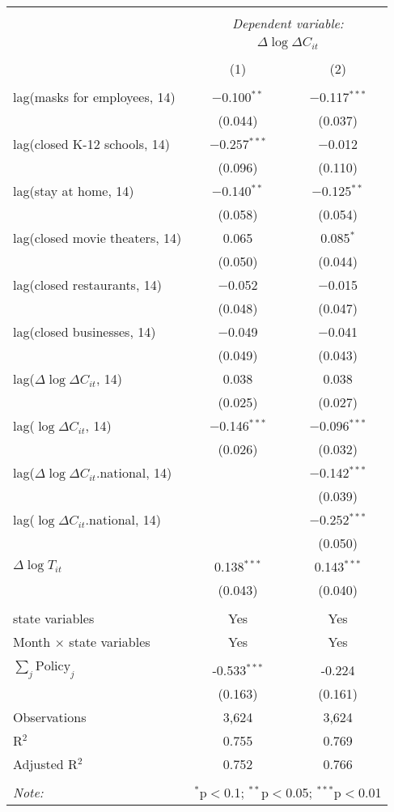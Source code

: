 \begin{tabular}{@{\extracolsep{1pt}}lcc} 
\\[-1.8ex]\hline 
\hline \\[-1.8ex] 
 & \multicolumn{2}{c}{\textit{Dependent variable:}} \\ 
\cline{2-3} 
 & \multicolumn{2}{c}{$\Delta \log \Delta C_{it}$} \\ 
\\[-1.8ex] & (1) & (2)\\ 
\hline \\[-1.8ex] 
 lag(masks for employees, 14) & $-$0.100$^{**}$ & $-$0.117$^{***}$ \\ 
  & (0.044) & (0.037) \\ 
  lag(closed K-12 schools, 14) & $-$0.257$^{***}$ & $-$0.012 \\ 
  & (0.096) & (0.110) \\ 
  lag(stay at home, 14) & $-$0.140$^{**}$ & $-$0.125$^{**}$ \\ 
  & (0.058) & (0.054) \\ 
  lag(closed movie theaters, 14) & 0.065 & 0.085$^{*}$ \\ 
  & (0.050) & (0.044) \\ 
  lag(closed restaurants, 14) & $-$0.052 & $-$0.015 \\ 
  & (0.048) & (0.047) \\ 
  lag(closed businesses, 14) & $-$0.049 & $-$0.041 \\ 
  & (0.049) & (0.043) \\ 
  lag($\Delta \log \Delta C_{it}$, 14) & 0.038 & 0.038 \\ 
  & (0.025) & (0.027) \\ 
  lag($\log \Delta C_{it}$, 14) & $-$0.146$^{***}$ & $-$0.096$^{***}$ \\ 
  & (0.026) & (0.032) \\ 
  lag($\Delta \log \Delta C_{it}$.national, 14) &  & $-$0.142$^{***}$ \\ 
  &  & (0.039) \\ 
  lag($\log \Delta C_{it}$.national, 14) &  & $-$0.252$^{***}$ \\ 
  &  & (0.050) \\ 
  $\Delta \log T_{it}$ & 0.138$^{***}$ & 0.143$^{***}$ \\ 
  & (0.043) & (0.040) \\ 
 \hline \\[-1.8ex] 
state variables & Yes & Yes \\ 
Month $\times$ state variables & Yes & Yes \\ 
\hline \\[-1.8ex] 
$\sum_j \mathrm{Policy}_j$ & -0.533$^{***}$ & -0.224 \\ 
 & (0.163) & (0.161) \\ 
Observations & 3,624 & 3,624 \\ 
R$^{2}$ & 0.755 & 0.769 \\ 
Adjusted R$^{2}$ & 0.752 & 0.766 \\ 
\hline 
\hline \\[-1.8ex] 
\textit{Note:}  & \multicolumn{2}{r}{$^{*}$p$<$0.1; $^{**}$p$<$0.05; $^{***}$p$<$0.01} \\ 
\end{tabular} 